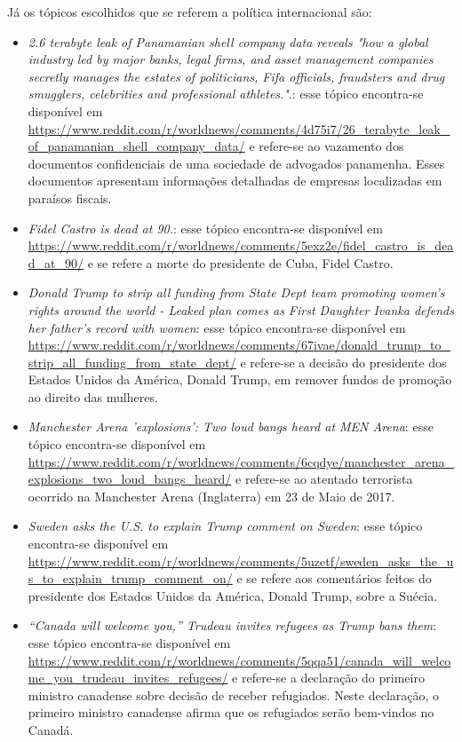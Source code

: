 Já os tópicos escolhidos que se referem a política internacional são:
\begin{itemize}
  \item
  \textit{2.6 terabyte leak of Panamanian shell company data reveals "how a
  global industry led by major banks, legal firms, and asset management companies
  secretly manages the estates of politicians, Fifa officials, fraudsters and
  drug smugglers, celebrities and professional
  athletes."}.: esse tópico encontra-se disponível em
  \url{https://www.reddit.com/r/worldnews/comments/4d75i7/26_terabyte_leak_of_panamanian_shell_company_data/}
  e refere-se ao vazamento dos documentos confidenciais de uma
  sociedade de advogados panamenha. Esses documentos apresentam informações
  detalhadas de empresas localizadas em paraísos fiscais.
  \item
  \textit{Fidel Castro is dead at
  90.}: esse tópico encontra-se disponível em
  \url{https://www.reddit.com/r/worldnews/comments/5exz2e/fidel_castro_is_dead_at_90/}
  e se refere a morte do presidente de Cuba, Fidel Castro.
  
  \item
  \textit{Donald Trump to strip all funding from State Dept team promoting
  women's rights around the world - Leaked plan comes as First Daughter Ivanka
  defends her father's record with women}: esse tópico encontra-se disponível em
  \url{https://www.reddit.com/r/worldnews/comments/67ivae/donald_trump_to_strip_all_funding_from_state_dept/}
  e refere-se a decisão do presidente dos Estados Unidos da América, Donald
  Trump, em remover fundos de promoção ao direito das mulheres.
  
  \item
  \textit{Manchester Arena 'explosions': Two loud bangs heard at MEN Arena}:
  esse tópico encontra-se disponível em
  \url{https://www.reddit.com/r/worldnews/comments/6cqdye/manchester_arena_explosions_two_loud_bangs_heard/}
  e refere-se ao atentado terrorista ocorrido na Manchester Arena (Inglaterra)
  em 23 de Maio de 2017.
  
  \item
  \textit{Sweden asks the U.S. to explain Trump comment on
  Sweden}: esse tópico encontra-se disponível em
  \url{https://www.reddit.com/r/worldnews/comments/5uzetf/sweden_asks_the_us_to_explain_trump_comment_on/}
  e se refere aos comentários feitos do presidente dos Estados Unidos da
  América, Donald Trump, sobre a Suécia.
  
  \item\textit{“Canada will welcome you,” Trudeau invites refugees as Trump bans
  them}: esse tópico encontra-se disponível em
  \url{https://www.reddit.com/r/worldnews/comments/5qqa51/canada_will_welcome_you_trudeau_invites_refugees/}
  e refere-se a declaração do primeiro ministro canadense sobre decisão de
  receber refugiados. Neste declaração, o primeiro ministro canadense afirma que
  os refugiados serão bem-vindos no Canadá.
\end{itemize}


